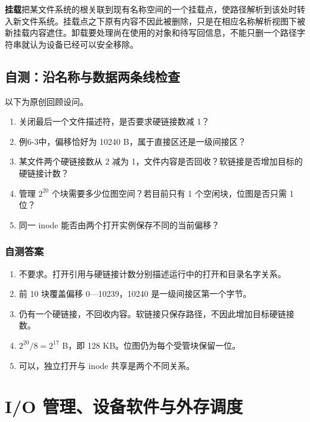 \textbf{挂载}把某文件系统的根关联到现有名称空间的一个挂载点，使路径解析到该处时转入新文件系统。挂载点之下原有内容不因此被删除，只是在相应名称解析视图下被新挂载内容遮住。卸载要处理尚在使用的对象和待写回信息，不能只删一个路径字符串就认为设备已经可以安全移除。

\section{自测：沿名称与数据两条线检查}\label{os-6-review}

以下为原创回顾设问。

\begin{enumerate}
\def\labelenumi{\arabic{enumi}.}
\tightlist
\item
  关闭最后一个文件描述符，是否要求硬链接数减 1？
\item
  例6-3中，偏移恰好为 10240 B，属于直接区还是一级间接区？
\item
  某文件两个硬链接数从 2 减为 1，文件内容是否回收？软链接是否增加目标的硬链接计数？
\item
  管理 \(2^{20}\) 个块需要多少位图空间？若目前只有 1 个空闲块，位图是否只需 1 位？
\item
  同一 inode 能否由两个打开实例保存不同的当前偏移？
\end{enumerate}

\subsection{自测答案}\label{os-c06-h190}

\begin{enumerate}
\def\labelenumi{\arabic{enumi}.}
\tightlist
\item
  不要求。打开引用与硬链接计数分别描述运行中的打开和目录名字关系。
\item
  前 10 块覆盖偏移 0---10239，10240 是一级间接区第一个字节。
\item
  仍有一个硬链接，不回收内容。软链接只保存路径，不因此增加目标硬链接数。
\item
  \(2^{20}/8=2^{17}\) B，即 128 KB。位图仍为每个受管块保留一位。
\item
  可以，独立打开与 inode 共享是两个不同关系。
\end{enumerate}

\chapter{I/O 管理、设备软件与外存调度}\label{os-ch7}

